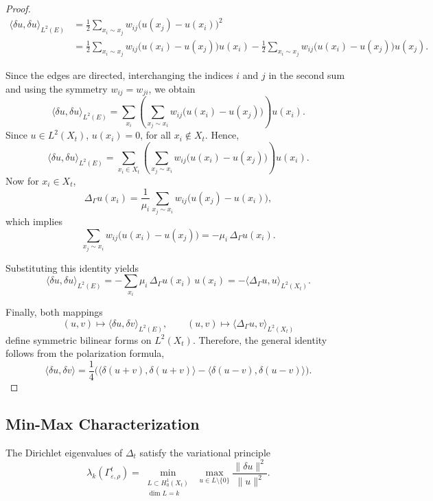 \documentclass[10 pt, reqno]{amsart}
\theoremstyle{definition}
\numberwithin{equation}{section}
\begin{document}
\begin{proof}

\begin{align*}
\langle \delta u, \delta u \rangle_{L^2(E)}
&=
\frac{1}{2}\sum_{x_i\sim x_j}
w_{ij}\bigl(u(x_j)-u(x_i)\bigr)^2 \\
&=
\frac{1}{2}\sum_{x_i\sim x_j}
w_{ij}\bigl(u(x_i)-u(x_j)\bigr)u(x_i)
-
\frac{1}{2}\sum_{x_i\sim x_j}
w_{ij}\bigl(u(x_i)-u(x_j)\bigr)u(x_j).
\end{align*}

Since the edges are directed, interchanging the indices $i$ and $j$ in the second sum and using the symmetry
$w_{ij}=w_{ji}$, we obtain
\[
\langle \delta u, \delta u \rangle_{L^2(E)}
=
\sum_{x_i}
\left(
\sum_{x_j\sim x_i}
w_{ij}\bigl(u(x_i)-u(x_j)\bigr)
\right)
u(x_i).
\]
Since $u\in L^2(X_t)$, $u(x_i)=0$, for all $x_i\notin X_t.$ Hence, 
                            \[
\langle \delta u, \delta u \rangle_{L^2(E)}
=
\sum_{x_i\in X_t}
\left(
\sum_{x_j\sim x_i}
w_{ij}\bigl(u(x_i)-u(x_j)\bigr)
\right)
u(x_i).
\]
Now for $x_i\in X_t$,
\[
\Delta_\Gamma u(x_i)
=
\frac{1}{\mu_i}
\sum_{x_j\sim x_i}
w_{ij}\bigl(u(x_j)-u(x_i)\bigr),
\]
which implies
\[
\sum_{x_j\sim x_i}
w_{ij}\bigl(u(x_i)-u(x_j)\bigr)
=
-\mu_i\,\Delta_\Gamma u(x_i).
\]

Substituting this identity yields
\[
\langle \delta u, \delta u \rangle_{L^2(E)}
=
-\sum_{x_i}
\mu_i\,\Delta_\Gamma u(x_i)\,u(x_i)
=
-\langle \Delta_\Gamma u, u \rangle_{L^2(X_t)}.
\]

Finally, both mappings
\[
(u,v)\mapsto \langle \delta u,\delta v\rangle_{L^2(E)},
\qquad
(u,v)\mapsto \langle \Delta_\Gamma u,v\rangle_{L^2(X_t)}
\]
define symmetric bilinear forms on $L^2(X_t)$.
Therefore, the general identity follows from the polarization formula,
\[
\langle \delta u,\delta v\rangle
=
\frac14\bigl(
\langle \delta(u+v),\delta(u+v)\rangle
-
\langle \delta(u-v),\delta(u-v)\rangle
\bigr).
\]

\end{proof}

\subsection{Min-Max Characterization}

The Dirichlet eigenvalues of $\Delta_t$ satisfy the variational principle
\[
\lambda_k(\Gamma^t_{\varepsilon,\rho})
=
\min_{\substack{L \subset H^1_0(X_t) \\ \dim L = k}}
\;
\max_{u \in L \setminus \{0\}}
\frac{\|\delta u\|^2}{\|u\|^2}.
\]
\end{document}
